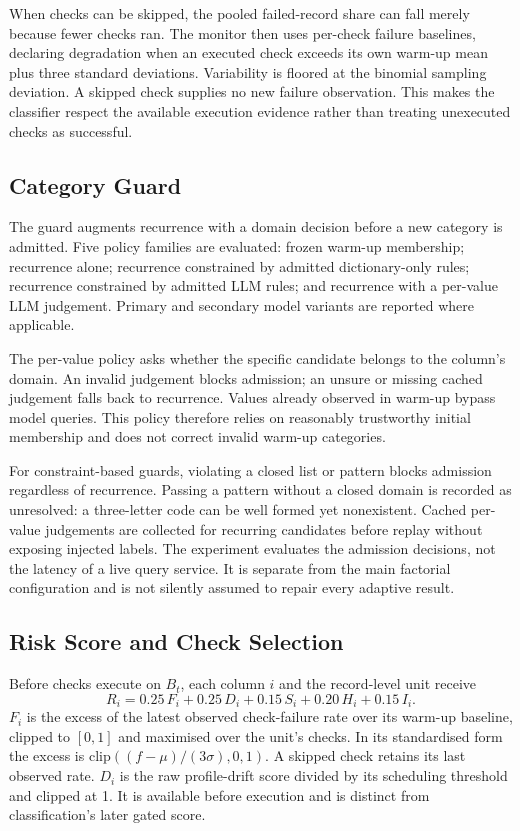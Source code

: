 When checks can be skipped, the pooled failed-record share can fall merely because fewer checks ran. The monitor then uses per-check failure baselines, declaring degradation when an executed check exceeds its own warm-up mean plus three standard deviations. Variability is floored at the binomial sampling deviation. A skipped check supplies no new failure observation. This makes the classifier respect the available execution evidence rather than treating unexecuted checks as successful.

\subsection{Category Guard}
\label{sec:method:guard}

The guard augments recurrence with a domain decision before a new category is admitted. Five policy families are evaluated: frozen warm-up membership; recurrence alone; recurrence constrained by admitted dictionary-only rules; recurrence constrained by admitted LLM rules; and recurrence with a per-value LLM judgement. Primary and secondary model variants are reported where applicable.

The per-value policy asks whether the specific candidate belongs to the column's domain. An invalid judgement blocks admission; an unsure or missing cached judgement falls back to recurrence. Values already observed in warm-up bypass model queries. This policy therefore relies on reasonably trustworthy initial membership and does not correct invalid warm-up categories.

For constraint-based guards, violating a closed list or pattern blocks admission regardless of recurrence. Passing a pattern without a closed domain is recorded as unresolved: a three-letter code can be well formed yet nonexistent. Cached per-value judgements are collected for recurring candidates before replay without exposing injected labels. The experiment evaluates the admission decisions, not the latency of a live query service. It is separate from the main factorial configuration and is not silently assumed to repair every adaptive result.

\subsection{Risk Score and Check Selection}
\label{sec:method:risk}

Before checks execute on $B_t$, each column $i$ and the record-level unit receive
\begin{equation}
R_i=0.25\,F_i+0.25\,D_i+0.15\,S_i+0.20\,H_i+0.15\,I_i.
\label{eq:risk}
\end{equation}
$F_i$ is the excess of the latest observed check-failure rate over its warm-up baseline, clipped to $[0,1]$ and maximised over the unit's checks. In its standardised form the excess is $\mathrm{clip}((f-\mu)/(3\sigma),0,1)$. A skipped check retains its last observed rate. $D_i$ is the raw profile-drift score divided by its scheduling threshold and clipped at 1. It is available before execution and is distinct from classification's later gated score.


